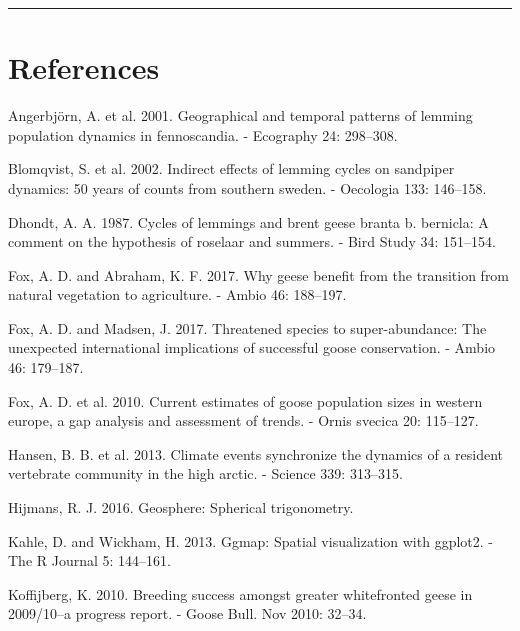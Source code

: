 \documentclass[twocolumn]{article}
\begin{document}
\begin{center}\rule{0.5\linewidth}{\linethickness}\end{center}

\section*{References}\label{references}

\hypertarget{refs}{}
\hypertarget{ref-angerbjorn2001geographical}{}
Angerbjörn, A. et al. 2001. Geographical and temporal patterns of
lemming population dynamics in fennoscandia. - Ecography 24: 298--308.

\hypertarget{ref-blomqvist2002indirect}{}
Blomqvist, S. et al. 2002. Indirect effects of lemming cycles on
sandpiper dynamics: 50 years of counts from southern sweden. - Oecologia
133: 146--158.

\hypertarget{ref-dhondt1987cycles}{}
Dhondt, A. A. 1987. Cycles of lemmings and brent geese branta b.
bernicla: A comment on the hypothesis of roselaar and summers. - Bird
Study 34: 151--154.

\hypertarget{ref-Fox2017b}{}
Fox, A. D. and Abraham, K. F. 2017. Why geese benefit from the
transition from natural vegetation to agriculture. - Ambio 46: 188--197.

\hypertarget{ref-Fox2017a}{}
Fox, A. D. and Madsen, J. 2017. Threatened species to super-abundance:
The unexpected international implications of successful goose
conservation. - Ambio 46: 179--187.

\hypertarget{ref-fox2010current}{}
Fox, A. D. et al. 2010. Current estimates of goose population sizes in
western europe, a gap analysis and assessment of trends. - Ornis svecica
20: 115--127.

\hypertarget{ref-hansen2013climate}{}
Hansen, B. B. et al. 2013. Climate events synchronize the dynamics of a
resident vertebrate community in the high arctic. - Science 339:
313--315.

\hypertarget{ref-geosphere}{}
Hijmans, R. J. 2016. Geosphere: Spherical trigonometry.

\hypertarget{ref-ggmap}{}
Kahle, D. and Wickham, H. 2013. Ggmap: Spatial visualization with
ggplot2. - The R Journal 5: 144--161.

\hypertarget{ref-koffijberg2010breeding}{}
Koffijberg, K. 2010. Breeding success amongst greater whitefronted geese
in 2009/10--a progress report. - Goose Bull. Nov 2010: 32--34.
\end{document}
